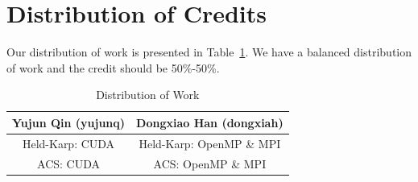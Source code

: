 \documentclass{article}
\begin{document}
\section{Distribution of Credits}
Our distribution of work is presented in Table~\ref{tab:credit}. We have a balanced distribution of work and the credit should be 50\%-50\%.
\begin{table}[!ht]
    \centering
    \begin{tabular}{c|c}
        Yujun Qin (yujunq) & Dongxiao Han (dongxiah) \\\hline
        Held-Karp: CUDA & Held-Karp: OpenMP \& MPI  \\ \hline
        ACS: CUDA & ACS: OpenMP \& MPI \\
    \end{tabular}
    \caption{Distribution of Work}
    \label{tab:credit}
\end{table}

%

\end{document}
